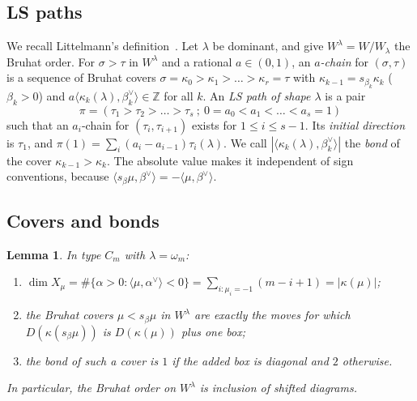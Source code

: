 \documentclass[11pt]{amsart}
\newtheorem{lemma}[theorem]{Lemma}
\theoremstyle{definition}
\theoremstyle{remark}
\newcommand{\Z}{\mathbb{Z}}
\begin{document}
\subsection{LS paths}
We recall Littelmann's definition~\cite{Lit94,LitICM}. Let $\lambda$ be dominant, and give
$W^\lambda=W/W_\lambda$ the Bruhat order. For $\sigma>\tau$ in $W^\lambda$ and a rational
$a\in(0,1)$, an \emph{$a$-chain} for $(\sigma,\tau)$ is a sequence of Bruhat covers
$\sigma=\kappa_0>\kappa_1>\dots>\kappa_r=\tau$ with $\kappa_{k-1}=s_{\beta_k}\kappa_k$
($\beta_k>0$) and $a\langle\kappa_k(\lambda),\beta_k^\vee\rangle\in\Z$ for all $k$. An
\emph{LS path of shape $\lambda$} is a pair
\[ \pi=(\tau_1>\tau_2>\dots>\tau_s\ ;\ 0=a_0<a_1<\dots<a_s=1) \]
such that an $a_i$-chain for $(\tau_i,\tau_{i+1})$ exists for $1\le i\le s-1$. Its
\emph{initial direction} is $\tau_1$, and $\pi(1)=\sum_i(a_i-a_{i-1})\tau_i(\lambda)$. We call
$|\langle\kappa_k(\lambda),\beta_k^\vee\rangle|$ the \emph{bond} of the cover
$\kappa_{k-1}>\kappa_k$. The absolute value makes it independent of sign conventions, because
$\langle s_\beta\mu,\beta^\vee\rangle=-\langle\mu,\beta^\vee\rangle$.

\subsection{Covers and bonds}

\begin{lemma}\label{lem:bonds}
In type $C_m$ with $\lambda=\omega_m$:
\begin{enumerate}[label=(\alph*)]
\item $\dim X_\mu=\#\{\alpha>0:\langle\mu,\alpha^\vee\rangle<0\}=\sum_{i:\mu_i=-1}(m-i+1)=|\kappa(\mu)|$;
\item the Bruhat covers $\mu<s_\beta\mu$ in $W^\lambda$ are exactly the moves for which
$D(\kappa(s_\beta\mu))$ is $D(\kappa(\mu))$ plus one box;
\item the bond of such a cover is $1$ if the added box is diagonal and $2$ otherwise.
\end{enumerate}
In particular, the Bruhat order on $W^\lambda$ is inclusion of shifted diagrams.
\end{lemma}
\end{document}
